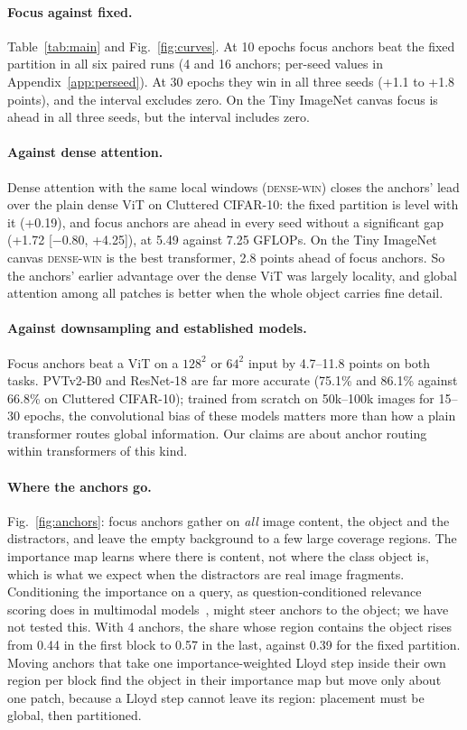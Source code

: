 \documentclass[runningheads]{llncs}
\newcommand{\densewin}{\textsc{dense-win}}
\begin{document}
\paragraph{Focus against fixed.} Table~\ref{tab:main} and Fig.~\ref{fig:curves}. At 10 epochs focus anchors beat the fixed
partition in all six paired runs (4 and 16 anchors; per-seed values in
Appendix~\ref{app:perseed}). At 30 epochs they win in all three seeds (+1.1 to +1.8 points), and
the interval excludes zero. On the Tiny ImageNet canvas focus is ahead in all three seeds, but the
interval includes zero.

\paragraph{Against dense attention.} Dense attention with the same local windows (\densewin)
closes the anchors' lead over the plain dense ViT on Cluttered CIFAR-10: the fixed partition is
level with it (+0.19), and focus anchors are ahead in every seed without a significant gap
(+1.72 [$-$0.80, +4.25]), at 5.49 against 7.25 GFLOPs. On the Tiny ImageNet canvas \densewin{} is
the best transformer, 2.8 points ahead of focus anchors. So the anchors' earlier advantage over
the dense ViT was largely locality, and global attention among all patches is better when the
whole object carries fine detail.

\paragraph{Against downsampling and established models.} Focus anchors beat a ViT on a
$128^2$ or $64^2$ input by 4.7--11.8 points on both tasks. PVTv2-B0 and ResNet-18 are far more
accurate (75.1\% and 86.1\% against 66.8\% on Cluttered CIFAR-10); trained from scratch on
50k--100k images for 15--30 epochs, the convolutional bias of these models matters more than how
a plain transformer routes global information. Our claims are about anchor routing within
transformers of this kind.

\paragraph{Where the anchors go.} Fig.~\ref{fig:anchors}: focus anchors gather on \emph{all}
image content, the object and the distractors, and leave the empty background to a few large
coverage regions. The importance map learns where there is content, not where the class object
is, which is what we expect when the distractors are real image fragments. Conditioning the
importance on a query, as question-conditioned relevance scoring does in multimodal
models~\cite{jiang2026lens}, might steer anchors to the object; we have not tested this. With 4 anchors, the
share whose region contains the object rises from 0.44 in the first block to 0.57 in the last,
against 0.39 for the fixed partition. Moving anchors that take one importance-weighted Lloyd step
inside their own region per block find the object in their importance map but move only about one
patch, because a Lloyd step cannot leave its region: placement must be global, then partitioned.
\end{document}
